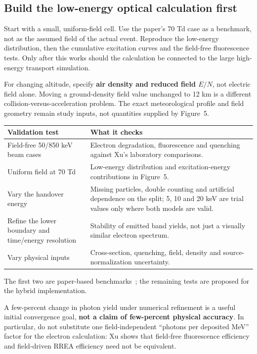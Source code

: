 \documentclass[11pt,a4paper]{article}
\newcommand{\xu}[1]{\cite[#1]{Xu2015}}
\newcommand{\source}[1]{{\small\color{muted}#1}\par}
\begin{document}
\subsection*{Build the low-energy optical calculation first}
Start with a small, uniform-field cell. Use the paper's 70 Td case as a benchmark, not as the assumed field of the actual event. Reproduce the low-energy distribution, then the cumulative excitation curves and the field-free fluorescence tests. Only after this works should the calculation be connected to the large high-energy transport simulation.

For changing altitude, specify \textbf{air density and reduced field $E/N$}, not electric field alone. Moving a ground-density field value unchanged to 12 km is a different collision-versus-acceleration problem. The exact meteorological profile and field geometry remain study inputs, not quantities supplied by Figure~5.\xu{Fig.~5; Sec.~3.2.1}

\begin{center}
\small
\begin{tabularx}{\textwidth}{@{}P{42mm}Y@{}}
\toprule
\textbf{Validation test} & \textbf{What it checks}\\
\midrule
Field-free 50/850 keV beam cases & Electron degradation, fluorescence and quenching against Xu's laboratory comparisons.\\
Uniform field at 70 Td & Low-energy distribution and excitation-energy contributions in Figure~5.\\
Vary the handover energy & Missing particles, double counting and artificial dependence on the split; 5, 10 and 20 keV are trial values only where both models are valid.\\
Refine the lower boundary and time/energy resolution & Stability of emitted band yields, not just a visually similar electron spectrum.\\
Vary physical inputs & Cross-section, quenching, field, density and source-normalization uncertainty.\\
\bottomrule
\end{tabularx}
\end{center}
\source{The first two are paper-based benchmarks~\cite{Xu2015}; the remaining tests are proposed for the hybrid implementation.}

A few-percent change in photon yield under numerical refinement is a useful initial convergence goal, \textbf{not a claim of few-percent physical accuracy}. In particular, do not substitute one field-independent ``photons per deposited MeV'' factor for the electron calculation: Xu shows that field-free fluorescence efficiency and field-driven RREA efficiency need not be equivalent.\xu{Sec.~4.1}
\end{document}
